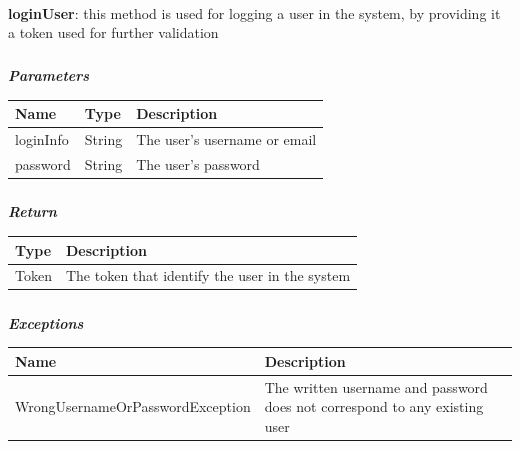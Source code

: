 					\paragraph{}
					\vspace{-1mm}
							\textbf{loginUser}: this method is used for logging a user in the system, by providing it a token used for further validation
							\subparagraph{}
							\vspace{-3mm}
							\textcolor{myBlue}{\textit{\textbf{Parameters}}}
							\vspace{-2mm}
								\begin{table}[!h]
									\begin{tabular}{L{0.2\textwidth}L{0.15\textwidth}L{0.53\textwidth}}
										\toprule
										\textbf{Name} & \textbf{Type} & \textbf{Description} \\
										\midrule
								  		loginInfo & String & The user's username or email \\
								  		password & String & The user's password \\
								 		\bottomrule
									\end{tabular}
								\end{table}
							\subparagraph{}
							\vspace{-7mm}
								\textcolor{myGreen}{\textit{\textbf{Return}}}
								\vspace{-2mm}
									\begin{table}[!h]
									\begin{tabular}{L{0.15\textwidth}L{0.77\textwidth}}
										\toprule
										\textbf{Type} & \textbf{Description} \\
										\midrule
								  		Token & The token that identify the user in the system \\
								  		\bottomrule
									\end{tabular}
								\end{table}
							\subparagraph{}
							\vspace{-7mm}
								\textcolor{myRed}{\textit{\textbf{Exceptions}}}
								\vspace{-2mm}
									\begin{table}[!h]
									\begin{tabular}{L{0.5\textwidth}L{0.42\textwidth}}
										\toprule
										\textbf{Name} & \textbf{Description} \\
										\midrule
								  	WrongUsernameOrPasswordException & The written username and password does not correspond to any existing user \\
								 		\bottomrule
									\end{tabular}
								\end{table}
					\clearpage			
